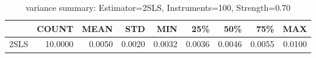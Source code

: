 \begin{table}[ht]
\centering
\caption{variance summary: Estimator=2SLS, Instruments=100, Strength=0.70}
\begin{tabular}{lrrrrrrrr}
\toprule
 & COUNT & MEAN & STD & MIN & 25\% & 50\% & 75\% & MAX \\
\midrule
2SLS & 10.0000 & 0.0050 & 0.0020 & 0.0032 & 0.0036 & 0.0046 & 0.0055 & 0.0100 \\
\bottomrule
\end{tabular}
\end{table}
